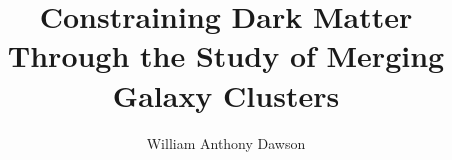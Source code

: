 \documentclass[12pt]{ucdavisthesis}
\title          {Constraining Dark Matter Through the Study of Merging Galaxy Clusters}
\author         {William Anthony Dawson}
\begin{document}
\renewcommand{\bibfont}{\singlespacing}
 


\makeintropages %






\appendix






\end{document}

